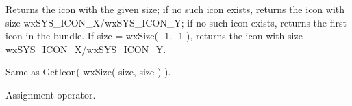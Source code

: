 Returns the icon with the given size; if no such icon exists,
returns the icon with size wxSYS\_ICON\_X/wxSYS\_ICON\_Y;
if no such icon exists,
returns the first icon in the bundle. If size = wxSize( -1, -1 ),
returns the icon with size wxSYS\_ICON\_X/wxSYS\_ICON\_Y.


Same as GetIcon( wxSize( size, size ) ).

\label{wxiconbundleoperatorassign}


Assignment operator.

